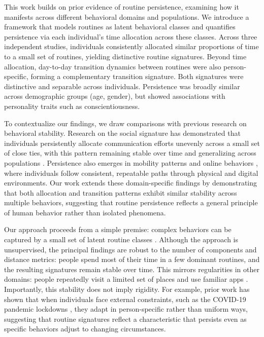 \documentclass[pdflatex,sn-vancouver,Numbered]{bst/sn-jnl}%
\theoremstyle{thmstyleone}%
\theoremstyle{thmstyletwo}%
\theoremstyle{thmstylethree}%
\begin{document}
This work builds on prior evidence of routine persistence, examining how it manifests across different behavioral domains and populations. We introduce a framework that models routines as latent behavioral classes and quantifies persistence via each individual’s time allocation across these classes. Across three independent studies, individuals consistently allocated similar proportions of time to a small set of routines, yielding distinctive routine signatures. Beyond time allocation, day-to-day transition dynamics between routines were also person-specific, forming a complementary transition signature. Both signatures were distinctive and separable across individuals. Persistence was broadly similar across demographic groups (age, gender), but showed associations with personality traits such as conscientiousness.

To contextualize our findings, we draw comparisons with previous research on behavioral stability. Research on the social signature has demonstrated that individuals persistently allocate communication efforts unevenly across a small set of close ties, with this pattern remaining stable over time and generalizing across populations \cite{saramaki2014persistence,heydari2018multichannel, iniguezUniversalPatternsEgocentric2023}. Persistence also emerges in mobility patterns \cite{alessandrettiUnderstandingInterplaySocial2018, alessandretti2020scales} and online behaviors \cite{kulshrestha2021web, malmi2016you}, where individuals follow consistent, repeatable paths through physical and digital environments. Our work extends these domain-specific findings by demonstrating that both allocation and transition patterns exhibit similar stability across multiple behaviors, suggesting that routine persistence reflects a general principle of human behavior rather than isolated phenomena.

Our approach proceeds from a simple premise: complex behaviors can be captured by a small set of latent routine classes \cite{eagleEigenbehaviorsIdentifyingStructure2009a,aledavood2022quantifying,zhou2022predicting}. Although the approach is unsupervised, the principal findings are robust to the number of components and distance metrics: people spend most of their time in a few dominant routines, and the resulting signatures remain stable over time. This mirrors regularities in other domains: people repeatedly visit a limited set of places \cite{alessandretti2020scales} and use familiar apps \cite{sekaraTemporalCulturalLimits2021}. Importantly, this stability does not imply rigidity. For example, prior work has shown that when individuals face external constraints, such as the COVID-19 pandemic lockdowns \cite{luong2023impact, luong2024sleep, girardini2023adaptation}, they adapt in person-specific rather than uniform ways, suggesting that routine signatures reflect a characteristic that persists even as specific behaviors adjust to changing circumstances. 
\end{document}
